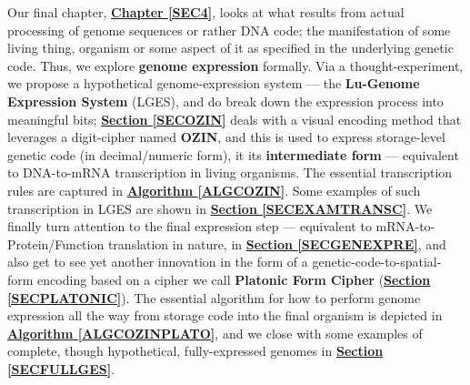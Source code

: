 \documentclass[a4paper, 18pt]{book} %
\begin{document}
Our final chapter, \textbf{\hyperref[SEC4]{Chapter \ref{SEC4}}}, looks at what results from actual processing of genome sequences or rather DNA code; the manifestation of some living thing, organism or some aspect of it as specified in the underlying genetic code. Thus, we explore \textbf{genome expression} formally. Via a thought-experiment, we propose a hypothetical genome-expression system --- the \textbf{Lu-Genome Expression System} (LGES), and do break down the expression process into meaningful bits; \textbf{\hyperref[SECOZIN]{Section \ref{SECOZIN}}} deals with a visual encoding method that leverages a digit-cipher named \textbf{OZIN}, and this is used to express storage-level genetic code (in decimal/numeric form), it its \textbf{intermediate form} --- equivalent to DNA-to-mRNA transcription in living organisms. The essential transcription rules are captured in \textbf{\hyperref[ALGCOZIN]{Algorithm \ref{ALGCOZIN}}}. Some examples of such transcription in LGES are shown in \textbf{\hyperref[SECEXAMTRANSC]{Section \ref{SECEXAMTRANSC}}}. We finally turn attention to the final expression step --- equivalent to mRNA-to-Protein/Function translation in nature, in \textbf{\hyperref[SECGENEXPRE]{Section \ref{SECGENEXPRE}}}, and also get to see yet another innovation in the form of a genetic-code-to-spatial-form encoding based on a cipher we call \textbf{Platonic Form Cipher} (\textbf{\hyperref[SECPLATONIC]{Section \ref{SECPLATONIC}}}). The essential algorithm for how to perform genome expression all the way from storage code into the final organism is depicted in \textbf{\hyperref[ALGCOZINPLATO]{Algorithm \ref{ALGCOZINPLATO}}}, and we close with some examples of complete, though hypothetical, fully-expressed genomes in \textbf{\hyperref[SECFULLGES]{Section \ref{SECFULLGES}}}.
\end{document}
